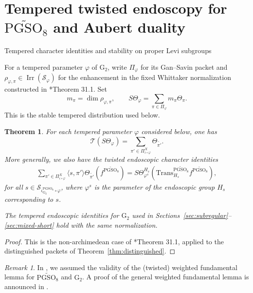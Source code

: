 \documentclass[12pt]{amsart}
\makeatletter
\renewcommand{\subsection}{\@startsection{subsection}{2}%
  \z@{.7\linespacing\@plus.5\linespacing}{.35\linespacing}%
  {\normalfont\bfseries\raggedright}}
\theoremstyle{definition}
\theoremstyle{plain}
\newtheorem{theorem}[definition]{Theorem}
\theoremstyle{remark}
\newtheorem{remark}[definition]{Remark}
\def\PGSO{\mathrm{PGSO}}
\DeclareMathOperator{\Irr}{Irr}%
\newcommand{\cS}{\mathcal{S}}
\numberwithin{equation}{section}
\newcommand{\rG}{\mathrm{G}}
\newcommand{\Trans}{\mathrm{Trans}}
\makeatother
\begin{document}
\section{Tempered twisted endoscopy for $\widetilde{\PGSO_8}$ and Aubert duality}\label{sec:twisted-endoscopy}

\subsection{Tempered character identities and stability on proper Levi subgroups}

For a tempered parameter $\varphi$ of $\rG_2$, write $\Pi_\varphi$
for its Gan--Savin packet and $\rho_{\varphi,\pi}\in\Irr(\cS_\varphi)$ for the enhancement in the fixed Whittaker normalization constructed in \cite{TakanashiEndoscopyLocal}*{Theorem 31.1}.
Set
\[
 m_\pi=\dim\rho_{\varphi,\pi},\qquad
 S\Theta_\varphi=\sum_{\pi\in\Pi_\varphi}m_\pi\Theta_\pi.
\]
This is the stable tempered distribution used below.

\begin{theorem}\label{thm:tempered-input}
For each tempered parameter $\varphi$ considered below, one has
\begin{equation}\label{eq:tempered-triality}
 \mathcal T(S\Theta_\varphi)=
 \sum_{\pi'\in\Pi^X_{\iota\circ\varphi}}\Theta_{\widetilde{\pi'}}.
\end{equation}
More generally, we also have the twisted endoscopic character identities
\begin{align*}
      \sum_{\pi'\in\Pi^X_{\iota\circ\varphi}} \langle s, \pi' \rangle \Theta_{\widetilde{\pi'}}(f^{\widetilde{\PGSO_8}})
      =
      S\Theta^{H_s}_{\varphi^s}(\Trans_{H_s}^{\widetilde{\PGSO_8}} f^{\widetilde{\PGSO_8}}),
\end{align*}
for all $s\in\cS_{\iota_{\rG_2}^{\PGSO_8}\circ\varphi}$, where $\varphi^s$ is the
parameter of the endoscopic group $H_s$ corresponding to $s$.

The tempered endoscopic identities for $\rG_2$ used in
Sections~\ref{sec:subregular}--\ref{sec:mixed-short} hold with the same
normalization.
\end{theorem}

\begin{proof}
This is the non-archimedean case of
\cite{TakanashiEndoscopyLocal}*{Theorem 31.1},
applied to the distinguished packets of Theorem~\ref{thm:distinguished}.
\end{proof}

\begin{remark}
      In \cite{TakanashiEndoscopyLocal}, we assumed the validity of the (twisted) weighted fundamental lemma for $\widetilde{\PGSO_8}$ and $\rG_2$.
      A proof of the general weighted fundamental lemma is announced in \cite{HalleckDube2026-WeightedFundamentalLemmaNonSplitGroups}.
\end{remark}
\end{document}
